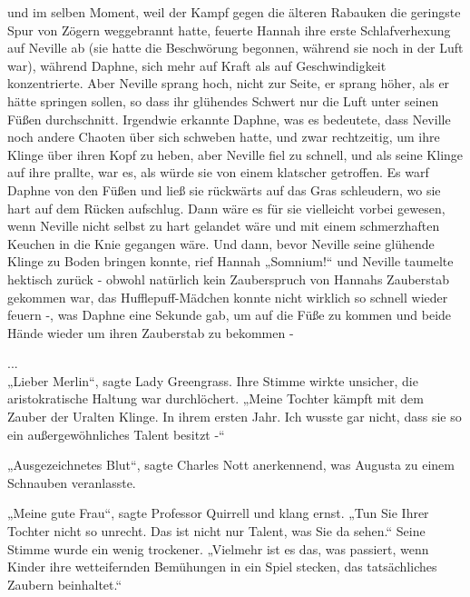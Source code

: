 {und im selben Moment, weil der Kampf gegen die älteren Rabauken die geringste Spur von Zögern weggebrannt hatte, feuerte Hannah ihre erste Schlafverhexung auf Neville ab (sie hatte die Beschwörung begonnen, während sie noch in der Luft war), während Daphne, sich mehr auf Kraft als auf Geschwindigkeit konzentrierte. Aber Neville sprang hoch, nicht zur Seite, er sprang höher, als er hätte springen sollen, so dass ihr glühendes Schwert nur die Luft unter seinen Füßen durchschnitt. Irgendwie erkannte Daphne, was es bedeutete, dass Neville noch andere Chaoten über sich schweben hatte, und zwar rechtzeitig, um ihre Klinge über ihren Kopf zu heben, aber Neville fiel zu schnell, und als seine Klinge auf ihre prallte, war es, als würde sie von einem klatscher getroffen. Es warf Daphne von den Füßen und ließ sie rückwärts auf das Gras schleudern, wo sie hart auf dem Rücken aufschlug. Dann wäre es für sie vielleicht vorbei gewesen, wenn Neville nicht selbst zu hart gelandet wäre und mit einem schmerzhaften Keuchen in die Knie gegangen wäre. Und dann, bevor Neville seine glühende Klinge zu Boden bringen konnte, rief Hannah „Somnium!“ und Neville taumelte hektisch zurück - obwohl natürlich kein Zauberspruch von Hannahs Zauberstab gekommen war, das Hufflepuff-Mädchen konnte nicht wirklich so schnell wieder feuern -, was Daphne eine Sekunde gab, um auf die Füße zu kommen und beide Hände wieder um ihren Zauberstab zu bekommen -

...\\ „Lieber Merlin“, sagte Lady Greengrass. Ihre Stimme wirkte unsicher, die aristokratische Haltung war durchlöchert. „Meine Tochter kämpft mit dem Zauber der Uralten Klinge. In ihrem ersten Jahr. Ich wusste gar nicht, dass sie so ein außergewöhnliches Talent besitzt -“

„Ausgezeichnetes Blut“, sagte Charles Nott anerkennend, was Augusta zu einem Schnauben veranlasste.

„Meine gute Frau“, sagte Professor Quirrell und klang ernst. „Tun Sie Ihrer Tochter nicht so unrecht. Das ist nicht nur Talent, was Sie da sehen.“ Seine Stimme wurde ein wenig trockener. „Vielmehr ist es das, was passiert, wenn Kinder ihre wetteifernden Bemühungen in ein Spiel stecken, das tatsächliches Zaubern beinhaltet.“

}
